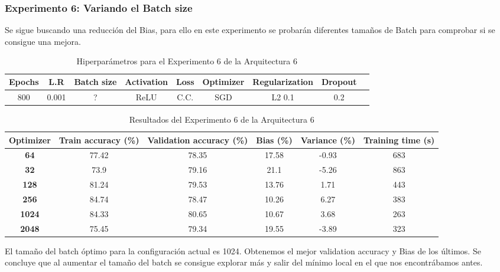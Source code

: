 \documentclass{article}
\begin{document}
   \subsubsection{Experimento 6: Variando el Batch size}

Se sigue buscando una reducci\'on del Bias, para ello en este experimento se probar\'an diferentes tama\~{n}os de Batch para comprobar si se consigue una mejora. 

    \begin{table}[!h]
				\begin{tabular}{|c|c|c|c|c|c|c|c|c|}
					\textbf{Epochs}&\textbf{L.R}&\textbf{Batch size}&\textbf{Activation}&\textbf{Loss}&\textbf{Optimizer}&\textbf{Regularization}&\textbf{Dropout}   \\ \hline
					800 & 0.001 & ?& ReLU & C.C. & SGD & L2 0.1 & 0.2 
				\end{tabular}
				\caption{Hiperpar\'ametros para el Experimento 6 de la Arquitectura 6}
				\label{tab:hip-a6-e2}
			\end{table}

    
   
   \begin{table}[!h]
				\begin{center}
					\begin{tabular}{ c | c | c | c | c | c |}
						 \textbf{Optimizer} & \textbf{Train accuracy (\%)} & \textbf{Validation accuracy (\%)} & \textbf{Bias (\%)} & \textbf{Variance (\%)} & \textbf{Training time (s)} \\ \hline
	
                        \textbf{64} &  77.42   &  78.35& 17.58 & -0.93 &   683  \\ \hline
                        \textbf{32} &  73.9    & 79.16& 21.1 & -5.26 &   863  \\ \hline
                        \textbf{128} &  81.24  &  79.53& 13.76 &  1.71  &   443   \\ \hline
                        \textbf{256} &  84.74 &  78.47 & 10.26 & 6.27 &   383    \\ \hline
                        \textbf{1024} & 84.33 &  80.65 & 10.67 & 3.68 &   263     \\ \hline
                        \textbf{2048} & 75.45 &  79.34 & 19.55  & -3.89 &   323      \\ \hline
					\end{tabular}
					\caption{Resultados del Experimento 6 de la Arquitectura 6}
					\label{tab:res-a2-e5}
				\end{center}
			\end{table}
   El tama\~{n}o del batch \'optimo para la configuraci\'on actual es 1024. Obtenemos el mejor validation accuracy y Bias de los \'ultimos. Se concluye que al aumentar el tama\~{n}o del batch se consigue explorar m\'as y salir del m\'inimo local en el que nos encontr\'abamos antes. 
\end{document}
